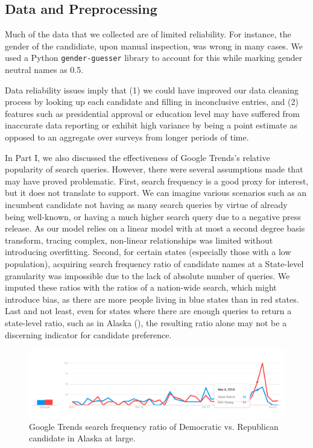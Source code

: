 \documentclass[12pt]{article}
\begin{document}
\subsection{Data and Preprocessing}

Much of the data that we collected are of limited reliability. For instance, the gender of the candidiate, upon manual inspection, was wrong in many cases. We used a Python \texttt{gender-guesser} library to account for this while marking gender neutral names as 0.5. 

Data reliability issues imply that (1) we could have improved our data cleaning
process by looking up each candidate and filling in inconclusive entries, and
(2) features such as presidential approval or education level may have suffered
from inaccurate data reporting or exhibit high variance by being a point
estimate as opposed to an aggregate over surveys from longer periods of time.

In Part I, we also discussed the effectiveness of Google Trends's relative
popularity of search queries. However, there were several assumptions made that
may have proved problematic. First, search frequency is a good proxy
for interest, but it does not translate to support. We can imagine various
scenarios such as an incumbent candidate not having as many search queries by
virtue of already being well-known, or having a much higher search query due to
a negative press release. As our model relies on a linear model with at most a
second degree basis transform, tracing complex, non-linear relationships was
limited without introducing overfitting. Second, for certain
states (especially those with a low population), acquiring search frequency
ratio of candidate names at a State-level granularity was impossible due to the
lack of absolute number of queries. We imputed these ratios with the ratios of a
nation-wide search, which might introduce bias, as there are more people living in blue states than in red states. Last and not least, even for states
where there are enough queries to return a state-level ratio, such as in Alaska
(), the resulting ratio alone may not be a discerning
indicator for candidate preference.

\begin{figure}[tb]
  \centering
  \includegraphics[scale=0.4]{alaska_candidate}
  \caption{Google Trends search frequency ratio of Democratic vs. Republican candidate in Alaska at large.}
  \label{fig:candidate_only}
\end{figure}
\end{document}
